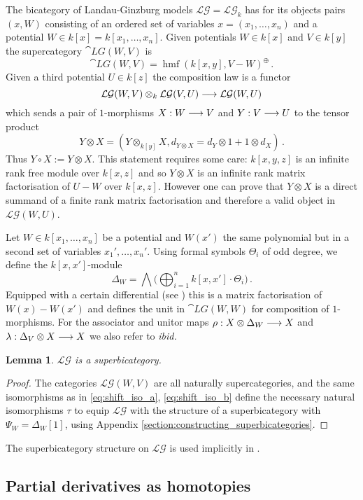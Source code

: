 \documentclass[english,letter paper,12pt,leqno]{article}
\newtheorem{lemma}[theorem]{Lemma}
\theoremstyle{example}
\numberwithin{equation}{section}
\def\LG{\mathcal{LG}}
\DeclareMathOperator{\hmf}{hmf}
\begin{document}
The bicategory of Landau-Ginzburg models $\LG = \LG_k$ has for its objects pairs $(x,W)$ consisting of an ordered set of variables $x = (x_1,\ldots,x_n)$ and a potential $W \in k[x] = k[x_1,\ldots,x_n]$. Given potentials $W \in k[x]$ and $V \in k[y]$ the supercategory $\cat{LG}(W,V)$ is
\[
\cat{LG}(W,V) = \hmf(k[x,y], V - W)^{\oplus}\,.
\]
Given a third potential $U \in k[z]$ the composition law is a functor
\[
\LG(W,V) \otimes_k \LG(V, U) \lto \LG(W, U)
\]
which sends a pair of $1$-morphisms $X: W \longrightarrow V$ and $Y: V \longrightarrow U$ to the tensor product
\begin{equation}\label{eq:tensor_comp}
Y \otimes X = ( Y \otimes_{k[y]} X, d_{Y \otimes X} = d_Y \otimes 1 + 1 \otimes d_X )\,.
\end{equation}
Thus $Y \circ X := Y \otimes X$. This statement requires some care: $k[x,y,z]$ is an infinite rank free module over $k[x,z]$ and so $Y \otimes X$ is an infinite rank matrix factorisation of $U - W$ over $k[x,z]$. However one can prove that $Y \otimes X$ is a direct summand of a finite rank matrix factorisation \cite{dm1102.2957} and therefore a valid object in $\LG(W,U)$.

Let $W \in k[x_1,\ldots,x_n]$ be a potential and $W(x')$ the same polynomial but in a second set of variables $x_1',\ldots,x_n'$. Using formal symbols $\Theta_i$ of odd degree, we define the $k[x,x']$-module
\[
\Delta_W = \bigwedge \big( \bigoplus_{i=1}^n k[x,x'] \cdot \Theta_i \big)\,.
\]
Equipped with a certain differential (see \cite[(2.15)]{lgdual}) this is a matrix factorisation of $W(x) - W(x')$ and defines the unit in $\cat{LG}(W,W)$ for composition of $1$-morphisms. For the associator and unitor maps $\rho: X \otimes \Delta_W \longrightarrow X$ and $\lambda: \Delta_V \otimes X \longrightarrow X$ we also refer to \emph{ibid.}

\begin{lemma} $\LG$ is a superbicategory.
\end{lemma}
\begin{proof}
The categories $\LG(W,V)$ are all naturally supercategories, and the same isomorphisms as in \eqref{eq:shift_iso_a}, \eqref{eq:shift_iso_b} define the necessary natural isomorphisms $\tau$ to equip $\LG$ with the structure of a superbicategory with $\Psi_W = \Delta_W[1]$, using Appendix \ref{section:constructing_superbicategories}.
\end{proof}

The superbicategory structure on $\LG$ is used implicitly in \cite[Section 7]{lgdual}.

\subsection{Partial derivatives as homotopies}\label{section:partial}
\end{document}
